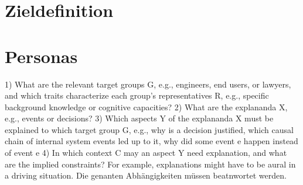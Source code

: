 \section{Zieldefinition}

\section{Personas}
1) What are the relevant target groups G, e.g., engineers, end users, or lawyers, and which traits characterize each group’s representatives R, e.g., specific background knowledge or cognitive capacities? 2) What are the explananda X, e.g., events or decisions? 3) Which aspects Y of the explananda X must be explained to which target group G, e.g., why is a decision justified, which causal chain of internal system events led up to it, why did some event e happen instead of event e 4) In which context C may an aspect Y need explanation, and what are the implied constraints? For example, explanations might have to be aural in a driving situation. \cite{kohl_explainability_2019} Die genanten Abhängigkeiten müssen beatnwortet werden.
